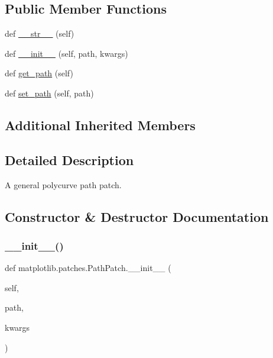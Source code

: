 \subsection*{Public Member Functions}
\begin{DoxyCompactItemize}
\item 
def \hyperlink{classmatplotlib_1_1patches_1_1PathPatch_a8d9a72a05b5fc5b10e23650b01c2716c}{\+\_\+\+\_\+str\+\_\+\+\_\+} (self)
\item 
def \hyperlink{classmatplotlib_1_1patches_1_1PathPatch_a9e30928a2baa094c185bae033ef34873}{\+\_\+\+\_\+init\+\_\+\+\_\+} (self, path, kwargs)
\item 
def \hyperlink{classmatplotlib_1_1patches_1_1PathPatch_a06b541aed3d1f3f359d90f01c46efd92}{get\+\_\+path} (self)
\item 
def \hyperlink{classmatplotlib_1_1patches_1_1PathPatch_a5af87d9f9919fa7cf381d4bd3b1ce26d}{set\+\_\+path} (self, path)
\end{DoxyCompactItemize}
\subsection*{Additional Inherited Members}


\subsection{Detailed Description}
\begin{DoxyVerb}A general polycurve path patch.\end{DoxyVerb}
 

\subsection{Constructor \& Destructor Documentation}
\mbox{\label{classmatplotlib_1_1patches_1_1PathPatch_a9e30928a2baa094c185bae033ef34873}} 
\subsubsection{\texorpdfstring{\+\_\+\+\_\+init\+\_\+\+\_\+()}{\_\_init\_\_()}}
{\footnotesize\ttfamily def matplotlib.\+patches.\+Path\+Patch.\+\_\+\+\_\+init\+\_\+\+\_\+ (\begin{DoxyParamCaption}\item[{}]{self,  }\item[{}]{path,  }\item[{}]{kwargs }\end{DoxyParamCaption})}

